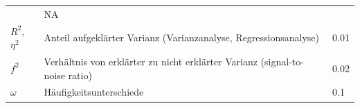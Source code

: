 \documentclass[12pt,ngerman,]{book}
\theoremstyle{definition}
\theoremstyle{definition}
\theoremstyle{remark}
\begin{document}
\begin{longtable}[]{@{}lll@{}}
\begin{minipage}[t]{0.42\columnwidth}
\end{minipage} & \begin{minipage}[t]{0.20\columnwidth}\raggedright\strut
NA\strut
\end{minipage}\tabularnewline
\begin{minipage}[t]{0.23\columnwidth}\raggedright\strut
\(R^2\), \(\eta^2\)\strut
\end{minipage} & \begin{minipage}[t]{0.42\columnwidth}\raggedright\strut
Anteil aufgeklärter Varianz (Varianzanalyse, Regressionsanalyse)\strut
\end{minipage} & \begin{minipage}[t]{0.20\columnwidth}\raggedright\strut
0.01\strut
\end{minipage}\tabularnewline
\begin{minipage}[t]{0.23\columnwidth}\raggedright\strut
\(f^2\)\strut
\end{minipage} & \begin{minipage}[t]{0.42\columnwidth}\raggedright\strut
Verhältnis von erklärter zu nicht erklärter Varianz (signal-to-noise
ratio)\strut
\end{minipage} & \begin{minipage}[t]{0.20\columnwidth}\raggedright\strut
0.02\strut
\end{minipage}\tabularnewline
\begin{minipage}[t]{0.23\columnwidth}\raggedright\strut
\(\omega\)\strut
\end{minipage} & \begin{minipage}[t]{0.42\columnwidth}\raggedright\strut
Häufigkeitsunterschiede\strut
\end{minipage} & \begin{minipage}[t]{0.20\columnwidth}\raggedright\strut
0.1\strut
\end{minipage}\tabularnewline
\bottomrule
\end{longtable}
\end{document}
